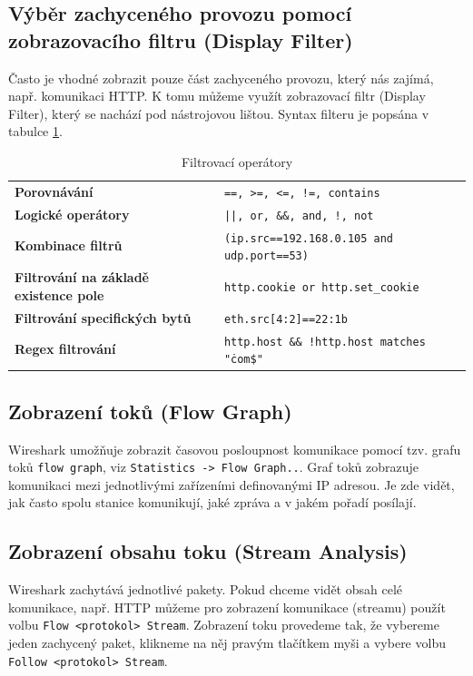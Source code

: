 \subsection{Výběr zachyceného provozu pomocí zobrazovacího filtru (Display Filter)}
Často je vhodné zobrazit pouze část zachyceného provozu, který nás zajímá, např. komunikaci HTTP. K tomu můžeme využít zobrazovací filtr (Display Filter), který se nachází pod nástrojovou lištou. Syntax filteru je popsána v tabulce \ref{tab:display-filter}. 

\begin{center}
  \begin{table}[h]
    \centering
    \def\arraystretch{1.2}
    \begin{tabular}{|l|l|}
      \hline
      \textbf{Porovnávání} & \texttt{==, >=, <=, !=, contains}\\
      \textbf{Logické operátory} & \texttt{||, or, \&\&, and, !, not}\\
      \textbf{Kombinace filtrů} & \texttt{(ip.src==192.168.0.105 and udp.port==53)}\\
      \textbf{Filtrování na základě existence pole} & \texttt{http.cookie or http.set\_cookie}\\
      \textbf{Filtrování specifických bytů} & \texttt{eth.src[4:2]==22:1b}\\
      \textbf{Regex filtrování} & \texttt{http.host \&\& !http.host matches "\.com\$"}\\
      \hline
    \end{tabular}
    \caption{Filtrovací operátory}\label{tab:display-filter}
  \end{table}
\end{center}

\subsection{Zobrazení toků (Flow Graph)}
Wireshark umožňuje zobrazit časovou posloupnost komunikace pomocí tzv. grafu toků \texttt{flow graph}, viz \texttt{Statistics -> Flow Graph..}. Graf toků zobrazuje komunikaci mezi jednotlivými zařízeními definovanými IP adresou. Je zde vidět, jak často spolu stanice komunikují, jaké zpráva a v jakém pořadí posílají. 

\subsection{Zobrazení obsahu toku (Stream Analysis)}
Wireshark zachytává jednotlivé pakety. Pokud chceme vidět obsah celé komunikace, např. HTTP můžeme pro zobrazení komunikace (streamu) použít volbu \texttt{Flow <protokol> Stream}. Zobrazení toku provedeme tak, že vybereme jeden zachycený paket, klikneme na něj pravým tlačítkem myši a vybere volbu  \texttt{Follow <protokol> Stream}.

